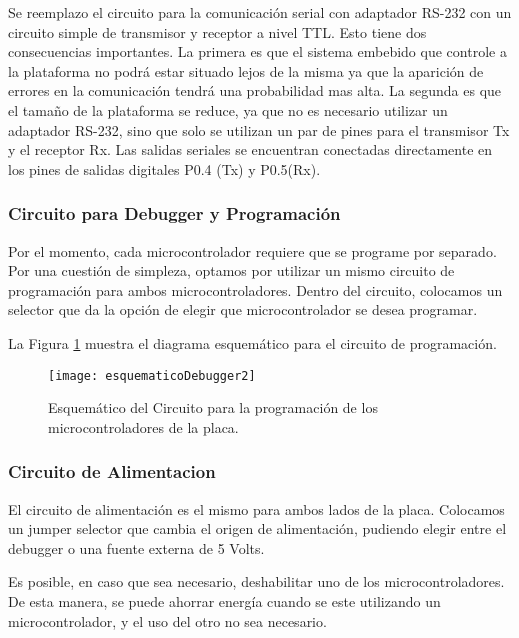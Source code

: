 Se reemplazo el circuito para la comunicación serial con adaptador RS-232 con un circuito simple de transmisor y receptor a nivel TTL. Esto tiene dos consecuencias importantes. La primera es que el sistema embebido que controle a la plataforma no podrá estar situado lejos de la misma ya que la aparición de errores en la comunicación tendrá una probabilidad mas alta. La segunda es que el tamaño de la plataforma se reduce, ya que no es necesario utilizar un adaptador RS-232, sino que solo se utilizan un par de pines para el transmisor Tx y el receptor Rx. Las salidas seriales se encuentran conectadas directamente en los pines de salidas digitales P0.4 (Tx) y P0.5(Rx).


\subsubsection{Circuito para Debugger y Programación} %
\label{subsub:debugger_programacion2}

Por el momento, cada microcontrolador requiere que se programe por separado. Por una cuestión de simpleza, optamos por utilizar un mismo circuito de programación para ambos microcontroladores. Dentro del circuito, colocamos un selector que da la opción de elegir que microcontrolador se desea programar.

La Figura \ref{fig:esquematicoDebugger2} muestra el diagrama esquemático para el circuito de programación.

\begin{figure}  [H]
\centering
  \texttt{[image: esquematicoDebugger2]}
  \caption{Esquemático del Circuito para la programación de los microcontroladores de la placa.}\label{fig:esquematicoDebugger2}
\end{figure}



\subsubsection{Circuito de Alimentacion}
\label{subscircuito_de_alimentacion}

El circuito de alimentación es el mismo para ambos lados de la placa. Colocamos un jumper selector que cambia el origen de alimentación, pudiendo elegir entre el debugger o una fuente externa de 5 Volts.

Es posible, en caso que sea necesario, deshabilitar uno de los microcontroladores. De esta manera, se puede ahorrar energía cuando se este utilizando un microcontrolador, y el uso del otro no sea necesario. 

